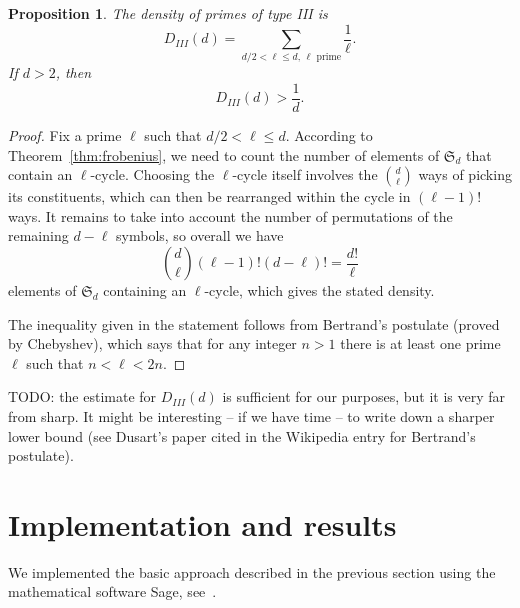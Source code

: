 \documentclass[11pt]{article}
\theoremstyle{plain}
\newtheorem{proposition}[theorem]{Proposition}
\theoremstyle{definition}
\theoremstyle{remark}
\numberwithin{equation}{section}
\numberwithin{table}{section}
\renewcommand{\SS}{\mathfrak{S}}
\begin{document}
\begin{proposition}
  The density of primes of type III is
  \begin{equation*}
    D_{III}(d)=\sum_{d/2<\ell\leq d, \,\ell\text{ prime}} \frac{1}{\ell}.
  \end{equation*}
  If $d>2$, then
  \begin{equation*}
    D_{III}(d)>\frac{1}{d}.
  \end{equation*}
\end{proposition}
\begin{proof}
  Fix a prime $\ell$ such that $d/2<\ell\leq d$.  According to
  Theorem~\ref{thm:frobenius}, we need to count the number of elements of
  $\SS_d$ that contain an $\ell$-cycle.  Choosing the $\ell$-cycle itself
  involves the $\binom{d}{\ell}$ ways of picking its constituents, which can
  then be rearranged within the cycle in $(\ell-1)!$ ways.  It remains to
  take into account the number of permutations of the remaining $d-\ell$ symbols,
  so overall we have
  \begin{equation*}
    \binom{d}{\ell}(\ell-1)!(d-\ell)!=\frac{d!}{\ell}
  \end{equation*}
  elements of $\SS_d$ containing an $\ell$-cycle, which gives the stated
  density.

  The inequality given in the statement follows from Bertrand's postulate
  (proved by Chebyshev), which says that for any integer $n>1$ there is at
  least one prime $\ell$ such that $n<\ell<2n$.
\end{proof}

TODO: the estimate for $D_{III}(d)$ is sufficient for our purposes, but it is
very far from sharp.  It might be interesting -- if we have time -- to write
down a sharper lower
bound (see Dusart's paper cited in the Wikipedia entry for Bertrand's
postulate).

\section{Implementation and results}
We implemented the basic approach described in the previous section
using the mathematical software Sage, see~\cite{Sage}.
\end{document}
